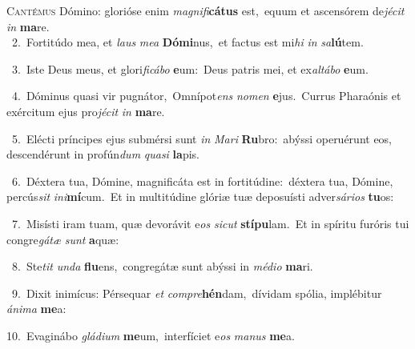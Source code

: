\lettrine{\initial\textcolor{\initialcolor}{C}}{antémus} Dómino: glorióse enim \textit{ma}\-\textit{gni}\textit{fi}\textbf{cá}\textbf{tus} est,~\star equum et ascensórem de\-\textit{jé}\-\textit{cit} \textit{in} \textbf{ma}\-re.\\
{\numbfont\textcolor{\numbcolor}{~2.}}~Fortitúdo mea, et \textit{laus} \textit{me}\-\textit{a} \textbf{Dó}\-\textbf{mi}nus,~\star et factus est mi\textit{hi} \textit{in} \textit{sa}\-\textbf{lú}tem.\par
{\numbfont\textcolor{\numbcolor}{~3.}}~Iste Deus meus, et glori\-\textit{fi}\-\textit{cá}\textit{bo} \textbf{e}\-um:~\star Deus patris mei, et ex\-\textit{al}\-\textit{tá}\textit{bo} \textbf{e}\-um.\par
{\numbfont\textcolor{\numbcolor}{~4.}}~Dóminus quasi vir pugnátor,~\dagger Omnípot\textit{ens} \textit{no}\-\textit{men} \textbf{e}\-jus.~\star Currus Pharaónis et exércitum ejus pro\-\textit{jé}\-\textit{cit} \textit{in} \textbf{ma}\-re.\par
{\numbfont\textcolor{\numbcolor}{~5.}}~Elécti príncipes ejus submérsi sunt \textit{in} \textit{Ma}\-\textit{ri} \textbf{Ru}\-bro:~\star abýssi operuérunt eos, descendérunt in profún\textit{dum} \textit{qua}\-\textit{si} \textbf{la}\-pis.\par
{\numbfont\textcolor{\numbcolor}{~6.}}~Déxtera tua, Dómine, magnificáta est in fortitúdine:~\dagger déxtera tua, Dómine, percús\textit{sit} \textit{in}\-\textit{i}\textbf{mí}cum.~\star Et in multitúdine glóriæ tuæ deposuísti adver\-\textit{sá}\-\textit{ri}\textit{os} \textbf{tu}\-os:\par
{\numbfont\textcolor{\numbcolor}{~7.}}~Misísti iram tuam, quæ devorávit e\textit{os} \textit{sic}\-\textit{ut} \textbf{stí}\-\textbf{pu}lam.~\star Et in spíritu furóris tui congre\-\textit{gá}\-\textit{tæ} \textit{sunt} \textbf{a}\-quæ:\par
{\numbfont\textcolor{\numbcolor}{~8.}}~Ste\textit{tit} \textit{un}\-\textit{da} \textbf{flu}\-ens,~\star congregátæ sunt abýssi in \textit{mé}\-\textit{di}\textit{o} \textbf{ma}\-ri.\par
{\numbfont\textcolor{\numbcolor}{~9.}}~Dixit inimícus: Pérsequar \textit{et} \textit{com}\-\textit{pre}\textbf{hén}dam,~\star dívidam spólia, implébitur \textit{á}\-\textit{ni}\textit{ma} \textbf{me}\-a:\par
{\numbfont\textcolor{\numbcolor}{10.}}~Evaginábo \textit{glá}\-\textit{di}\textit{um} \textbf{me}\-um,~\star interfíciet e\textit{os} \textit{ma}\-\textit{nus} \textbf{me}\-a.\par
